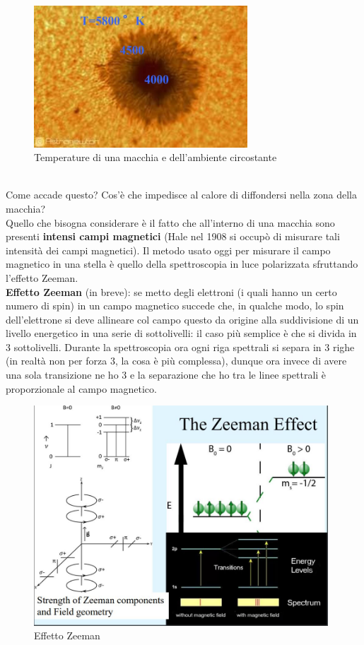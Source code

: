 \documentclass[a4paper,11pt]{article}
\begin{document}
        \begin{figure}[h!!]
            \centering
                \includegraphics[width=8cm]{2dic/TemperaturaMacchia.jpg}
                \caption{Temperature di una macchia e dell'ambiente circostante}
            \label{fig:TempMacchia}
        \end{figure}
        \\
        Come accade questo? Cos'è che impedisce al calore di diffondersi nella zona della macchia? \\
        Quello che bisogna considerare è il fatto che all'interno di una macchia sono presenti \textbf{intensi campi magnetici} (Hale nel 1908 si occupò di misurare tali intensità dei campi magnetici).
        Il metodo usato oggi per misurare il campo magnetico in una stella è quello della spettroscopia in luce polarizzata sfruttando l'effetto Zeeman. \\
        \textbf{Effetto Zeeman} (in breve): se metto degli elettroni (i quali hanno un certo numero di spin) in un campo magnetico succede che, in qualche modo, lo spin dell'elettrone si deve allineare col campo questo da origine alla suddivisione di un livello energetico in una serie di sottolivelli: il caso più semplice è che si divida in 3 sottolivelli. Durante la spettroscopia ora ogni riga spettrali si separa in 3 righe (in realtà non per forza 3, la cosa è più complessa), dunque ora invece di avere una sola transizione ne ho 3 e la separazione che ho tra le linee spettrali è proporzionale al campo magnetico.
        \\
        \begin{figure}[h!!]
            \centering
                \includegraphics[width=11cm]{2dic/Effetto_Zeeman.jpg}
                \caption{Effetto Zeeman}
            \label{fig:Zeeman}
        \end{figure}
\end{document}
